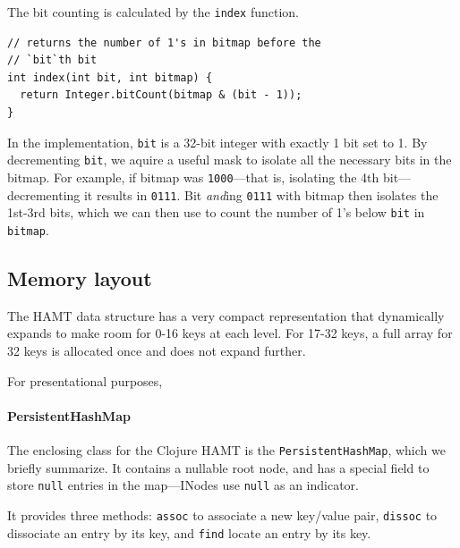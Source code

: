 \documentclass[preprint]{sigplanconf}
\begin{document}
The bit counting is calculated by
the \texttt{index} function.

\begin{verbatim}
// returns the number of 1's in bitmap before the 
// `bit`th bit
int index(int bit, int bitmap) {
  return Integer.bitCount(bitmap & (bit - 1));
}
\end{verbatim}

In the implementation, \texttt{bit}
is a 32-bit integer with exactly 1 bit set to 1.
By decrementing \texttt{bit}, we aquire
a useful mask to isolate all the necessary
bits in the bitmap.
For example, if bitmap was \texttt{1000}---that
is, isolating the 4th bit---decrementing it results 
in \texttt{0111}.
Bit \textit{and}ing \texttt{0111}
with bitmap then isolates the 1st-3rd bits, which
we can then use to count the number of 1's
below \texttt{bit} in \texttt{bitmap}.

\subsection{Memory layout}

The HAMT data structure has a very compact representation
that dynamically expands to make room for 0-16 keys
at each level. For 17-32 keys, a full array for 32 keys
is allocated once and does not expand further.

For presentational purposes, 

\paragraph{PersistentHashMap}

The enclosing class for the Clojure HAMT
is the \texttt{PersistentHashMap},
which we briefly summarize.
It contains a nullable root node,
and has a special field to store
\texttt{null} entries in the map---INodes
use \texttt{null} as an indicator.

It provides three methods: 
\texttt{assoc} to associate a new key/value pair, 
\texttt{dissoc} to dissociate an entry by its key, 
and \texttt{find} locate an entry by its key.

\end{document}
